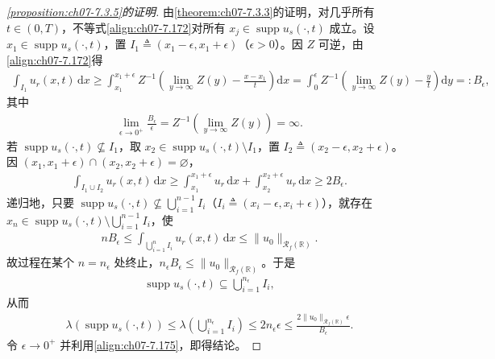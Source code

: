 \documentclass[../../main.tex]{subfiles}%
\begin{document}
\begin{proof}[\cref{proposition:ch07-7.3.5}的证明]
由\cref{theorem:ch07-7.3.3}的证明，对几乎所有 $t\in(0,T)$，不等式\eqref{align:ch07-7.172}对所有 $x_j\in\operatorname{supp}u_s(\cdot,t)$ 成立。设 $x_1\in\operatorname{supp}u_s(\cdot,t)$，置 $I_1\triangleq (x_1-\epsilon,x_1+\epsilon)$（$\epsilon>0$）。因 $Z$ 可逆，由\eqref{align:ch07-7.172}得
\begin{align*}
\int_{I_1}u_r(x,t)\,\mathrm{d}x\geqslant\int_{x_1}^{x_1+\epsilon}Z^{-1}\!\left(\lim_{y\to\infty}Z(y)-\frac{x-x_1}{t}\right)\mathrm{d}x
=\int_0^\epsilon Z^{-1}\!\left(\lim_{y\to\infty}Z(y)-\frac{y}{t}\right)\mathrm{d}y=:B_\epsilon,
\end{align*}
其中
\begin{align}
\lim_{\epsilon\to0^+}\frac{B_\epsilon}{\epsilon}=Z^{-1}\!\left(\lim_{y\to\infty}Z(y)\right)=\infty. \label{align:ch07-7.175}
\end{align}
若 $\operatorname{supp}u_s(\cdot,t)\not\subseteq I_1$，取 $x_2\in\operatorname{supp}u_s(\cdot,t)\setminus I_1$，置 $I_2\triangleq (x_2-\epsilon,x_2+\epsilon)$。因 $(x_1,x_1+\epsilon)\cap(x_2,x_2+\epsilon)=\varnothing $，
\begin{align*}
\int_{I_1\cup I_2}u_r(x,t)\,\mathrm{d}x\geqslant\int_{x_1}^{x_1+\epsilon}u_r\,\mathrm{d}x+\int_{x_2}^{x_2+\epsilon}u_r\,\mathrm{d}x\geqslant2B_\epsilon.
\end{align*}
递归地，只要 $\operatorname{supp}u_s(\cdot,t)\not\subseteq\bigcup_{i=1}^{n-1}I_i$（$I_i\triangleq (x_i-\epsilon,x_i+\epsilon)$），就存在 $x_n\in\operatorname{supp}u_s(\cdot,t)\setminus\bigcup_{i=1}^{n-1}I_i$，使
\begin{align*}
nB_\epsilon\leqslant\int_{\bigcup_{i=1}^n I_i}u_r(x,t)\,\mathrm{d}x\leqslant\|u_0\|_{\mathscr{R}_f(\mathbb{R})}.
\end{align*}
故过程在某个 $n=n_\epsilon$ 处终止，$n_\epsilon B_\epsilon\leqslant\|u_0\|_{\mathscr{R}_f(\mathbb{R})}$。于是
\begin{align*}
\operatorname{supp}u_s(\cdot,t)\subseteq\bigcup_{i=1}^{n_\epsilon}I_i,
\end{align*}
从而
\begin{align*}
\lambda(\operatorname{supp}u_s(\cdot,t))\leqslant\lambda\!\left(\bigcup_{i=1}^{n_\epsilon}I_i\right)\leqslant2n_\epsilon\epsilon
\leqslant\frac{2\|u_0\|_{\mathscr{R}_f(\mathbb{R})}\epsilon}{B_\epsilon}.
\end{align*}
令 $\epsilon\to0^+$ 并利用\eqref{align:ch07-7.175}，即得结论。
\end{proof}
\end{document}
